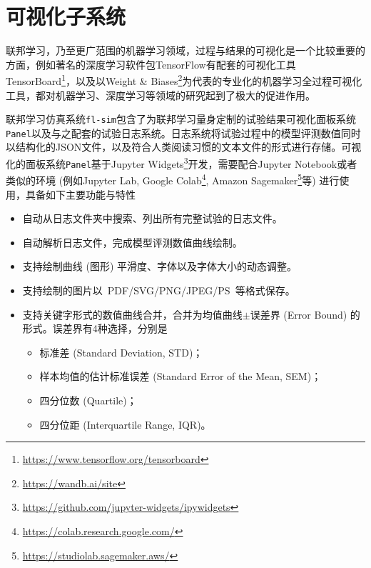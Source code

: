 \section{可视化子系统}
\label{sec:chap5-viz}


联邦学习，乃至更广范围的机器学习领域，过程与结果的可视化是一个比较重要的方面，例如著名的深度学习软件包TensorFlow\cite{tensorflow}有配套的可视化工具TensorBoard\footnote{\url{https://www.tensorflow.org/tensorboard}}，以及以Weight \& Biases\footnote{\url{https://wandb.ai/site}}为代表的专业化的机器学习全过程可视化工具，都对机器学习、深度学习等领域的研究起到了极大的促进作用。

联邦学习仿真系统\texttt{fl-sim}包含了为联邦学习量身定制的试验结果可视化面板系统\texttt{Panel}以及与之配套的试验日志系统。日志系统将试验过程中的模型评测数值同时以结构化的JSON文件，以及符合人类阅读习惯的文本文件的形式进行存储。可视化的面板系统\texttt{Panel}基于Jupyter Widgets\footnote{\url{https://github.com/jupyter-widgets/ipywidgets}}开发，需要配合Jupyter Notebook\cite{jupyter_2016}或者类似的环境 (例如Jupyter Lab\cite{Granger_2021_Jupyter}, Google Colab\footnote{\url{https://colab.research.google.com/}}, Amazon Sagemaker\footnote{\url{https://studiolab.sagemaker.aws/}}等) 进行使用，具备如下主要功能与特性
\begin{itemize}
    \item 自动从日志文件夹中搜索、列出所有完整试验的日志文件。
    \item 自动解析日志文件，完成模型评测数值曲线绘制。
    \item 支持绘制曲线 (图形) 平滑度、字体以及字体大小的动态调整。
    \item 支持绘制的图片以~PDF/SVG/PNG/JPEG/PS~等格式保存。
    \item 支持关键字形式的数值曲线合并，合并为均值曲线$\pm$误差界 (Error Bound) 的形式。误差界有4种选择，分别是
    \begin{itemize}
        \item 标准差 (Standard Deviation, STD)；
        \item 样本均值的估计标准误差 (Standard Error of the Mean, SEM)；
        \item 四分位数 (Quartile)；
        \item 四分位距 (Interquartile Range, IQR)。
    \end{itemize}
\end{itemize}


